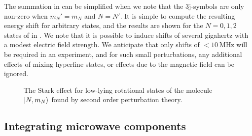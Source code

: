 The summation in  can be simplified when we note that the 3j-symbols
are only non-zero when $m_N' = m_N$ and $N=N'$. It
is simple to compute the resulting energy shift for arbitrary states, and the
results are shown for the $N=0, 1, 2$ states of \CaF{} in . We
note that it is possible to induce shifts
of several gigahertz with a modest electric field strength. We anticipate that
only shifts of $<\SI{10}{\mega\hertz}$ will be required in an
experiment, and for such small perturbations, any additional effects of mixing
hyperfine states, or effects due to the magnetic field can be ignored.

\begin{figure}[h]
  \centering
  \caption[The Stark effect in \CaF{}]{
    The Stark effect for low-lying rotational states of the \CaF{} molecule $\ket{N,
    m_N}$ found by second order perturbation theory.}
  \label{mws:fig:stark}
\end{figure}

\subsection{Integrating microwave components}
\label{mws:components}

